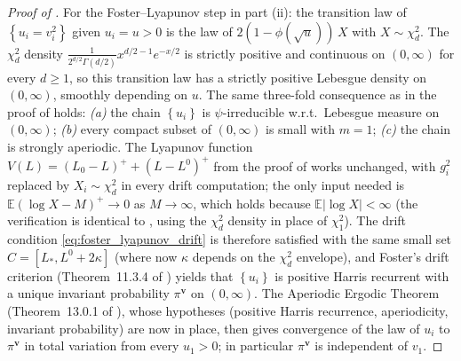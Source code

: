 \documentclass{article}
\newcommand{\Set}[1]{\left\{ #1 \right\}}
\newcommand{\Exp}[1]{\mathbb{E} #1}
\newcommand{\bv}{\mathbf{v}}
\begin{document}
\begin{proof}[Proof of ]
  For the Foster--Lyapunov step in part (ii): the transition law of $\Set{u_i = v_i^2}$ given $u_i = u > 0$ is the law of $2(1-\phi(\sqrt u))\,X$ with $X \sim \chi^2_d$. The $\chi^2_d$ density $\frac{1}{2^{d/2}\Gamma(d/2)} x^{d/2-1} e^{-x/2}$ is strictly positive and continuous on $(0,\infty)$ for every $d \ge 1$, so this transition law has a strictly positive Lebesgue density on $(0,\infty)$, smoothly depending on $u$. The same three-fold consequence as in the proof of  holds: \emph{(a)} the chain $\Set{u_i}$ is $\psi$-irreducible w.r.t.\ Lebesgue measure on $(0,\infty)$; \emph{(b)} every compact subset of $(0,\infty)$ is small with $m = 1$; \emph{(c)} the chain is strongly aperiodic. The Lyapunov function $V(L) = (L_0 - L)^+ + (L - L^0)^+$ from the proof of  works unchanged, with $g_i^2$ replaced by $X_i \sim \chi^2_d$ in every drift computation; the only input needed is $\Exp{(\log X - M)^+} \to 0$ as $M \to \infty$, which holds because $\Exp{|\log X|} < \infty$ (the verification is identical to , using the $\chi^2_d$ density in place of $\chi^2_1$). The drift condition \eqref{eq:foster_lyapunov_drift} is therefore satisfied with the same small set $C = [L_*, L^0 + 2\kappa]$ (where now $\kappa$ depends on the $\chi^2_d$ envelope), and Foster's drift criterion (Theorem~11.3.4 of \cite{meyn1993markov}) yields that $\Set{u_i}$ is positive Harris recurrent with a unique invariant probability $\pi^{\bv}$ on $(0,\infty)$. The Aperiodic Ergodic Theorem (Theorem~13.0.1 of \cite{meyn1993markov}), whose hypotheses (positive Harris recurrence, aperiodicity, invariant probability) are now in place, then gives convergence of the law of $u_i$ to $\pi^{\bv}$ in total variation from every $u_1 > 0$; in particular $\pi^{\bv}$ is independent of $v_1$.
\end{proof}
\end{document}
